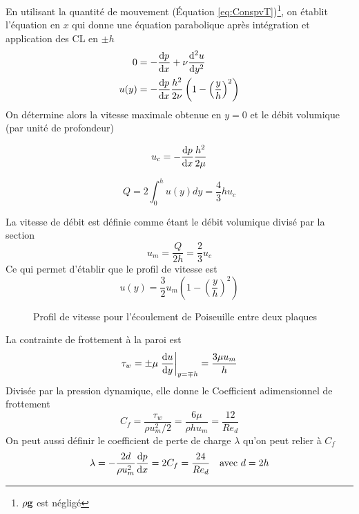 \documentclass[a4paper,11pt]{report}
\begin{document}
        En utilisant la quantité de mouvement (Équation \ref{eq:ConspvT})\footnote{$\rho \vb{g}$ est négligé}, on établit l'équation en $x$ qui donne une équation parabolique après intégration et application des CL en $\pm h$
        \begin{equation}
          \begin{aligned}
            0 &= -\dv{p}{x} + \nu\dv[2]{u}{y} \\
            u(y) &= -\dv{p}{x}\frac{h^2}{2\nu} \left(1 - \left(\frac{y}{h}\right)^2\right)
          \end{aligned}
        \end{equation}
        On détermine alors la vitesse maximale obtenue en $y = 0$ et le débit volumique (par unité de profondeur)
        \begin{multicols}{2}
          \begin{equation}
            u_c = -\dv{p}{x} \frac{h^2}{2\mu}
          \end{equation}

          \begin{equation}
            Q = 2\int_0^h u(y)dy = \frac{4}{3} h u_c
          \end{equation}
        \end{multicols}

        La vitesse de débit est définie comme étant le débit volumique divisé par la section
        \begin{equation}
          u_m = \frac{Q}{2h} = \frac{2}{3} u_c
        \end{equation}
        Ce qui permet d'établir que le profil de vitesse est
        \begin{equation}
          u(y) = \frac{3}{2} u_m \left(1-\left(\frac{y}{h}\right)^2\right)
        \end{equation}

        \begin{figure}[!h]
          \centering
          
          \caption{Profil de vitesse pour l'écoulement de Poiseuille entre deux plaques}
          \label{fig:PoiseuilleProfile}
        \end{figure}

        La contrainte de frottement à la paroi est
        \begin{equation}
          \tau_w = \pm \mu \eval{\dv{u}{y}}_{y=\mp h} = \frac{3\mu u_m}{h}
        \end{equation}
        Divisée par la pression dynamique, elle donne le Coefficient adimensionnel de frottement
        \begin{equation}
          C_f = \frac{\tau_w}{\rho u_m^2/2} = \frac{6\mu}{\rho h u_m} = \frac{12}{Re_d}
        \end{equation}
        On peut aussi définir le coefficient de perte de charge $\lambda$ qu'on peut relier à $C_f$
        \begin{equation}
          \lambda = -\frac{2d}{\rho u_m^2}\dv{p}{x} = 2 C_f = \frac{24}{Re_d} \quad \textrm{avec } d = 2h
        \end{equation}

\begin{appendix}
  
\end{appendix}
\end{document}
